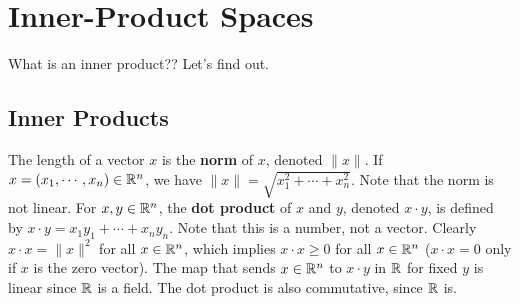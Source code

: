 \section{Inner-Product Spaces}
What is an inner product?? Let's find out.
\subsection{Inner Products}
The length of a vector $x$ is the \textbf{norm} of $x$, denoted $\| x\|.$ If $x=(x_1,\cdots ,x_n )\in \mathbb{R}^n $, we have $\|x\|=\sqrt{x_1^2+\cdots +x_n ^2} $. Note that the norm is not linear. For $x,y\in \mathbb{R}^n $, the \textbf{dot product} of $x$ and $y$, denoted $x\cdot y$, is defined by $x\cdot y=x_1y_1+\cdots +x_n y_n $. Note that this is a number, not a vector. Clearly $x\cdot x=\|x\|^2$ for all $x\in \mathbb{R}^n $, which implies $x\cdot x\geq 0$ for all $x\in \mathbb{R}^n $ ($x\cdot x=0$ only if $x$ is the zero vector). The map that sends  $x\in \mathbb{R}^n $ to $x\cdot y$ in $\mathbb{R}$ for fixed $y$ is linear since $\mathbb{R}$ is a field. The dot product is also commutative, since $\mathbb{R}$ is.

